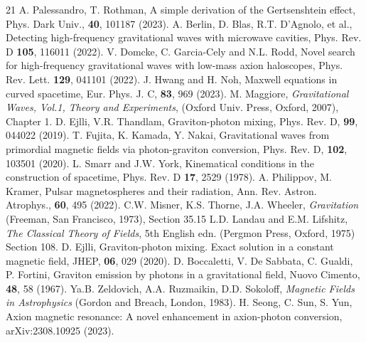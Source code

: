 \documentclass[twocolumn,amsmath,amssymb]{revtex4}
\begin{document}
\begin{thebibliography}{21}
         A. Palessandro, T. Rothman, A simple derivation of the Gertsenshtein effect, Phys. Dark Univ., {\bf 40}, 101187 (2023).
         A. Berlin, D. Blas, R.T. D'Agnolo, et al., Detecting high-frequency gravitational waves with microwave cavities, Phys. Rev. D {\bf 105}, 116011 (2022).
         V. Domcke, C. Garcia-Cely and N.L. Rodd, Novel search for high-frequency gravitational waves with low-mass axion haloscopes, Phys. Rev. Lett. {\bf 129}, 041101 (2022).
         J. Hwang and H. Noh, Maxwell equations in curved spacetime, Eur. Phys. J. C, {\bf 83}, 969 (2023).
         M. Maggiore, {\it Gravitational Waves, Vol.1, Theory and Experiments}, (Oxford Univ. Press, Oxford, 2007), Chapter 1.
         D. Ejlli, V.R. Thandlam, Graviton-photon mixing, Phys. Rev. D, {\bf 99}, 044022 (2019).
         T. Fujita, K. Kamada, Y. Nakai, Gravitational waves from primordial magnetic fields via photon-graviton conversion, Phys. Rev. D, {\bf 102}, 103501 (2020).
         L. Smarr and J.W. York, Kinematical conditions in the construction of spacetime, Phys. Rev. D {\bf 17}, 2529 (1978).
         A. Philippov, M. Kramer, Pulsar magnetospheres and their radiation, Ann. Rev. Astron. Atrophys., {\bf 60}, 495 (2022).
         C.W. Misner, K.S. Thorne, J.A. Wheeler, {\it Gravitation} (Freeman, San Francisco, 1973), Section 35.15
         L.D. Landau and E.M. Lifshitz, {\it The Classical Theory of Fields}, 5th English edn. (Pergmon Press, Oxford, 1975) Section 108.
         D. Ejlli, Graviton-photon mixing. Exact solution in a constant magnetic field, JHEP, {\bf 06}, 029 (2020).
         D. Boccaletti, V. De Sabbata, C. Gualdi, P. Fortini, Graviton emission by photons in a gravitational field, Nuovo Cimento, {\bf 48}, 58 (1967).
         Ya.B. Zeldovich, A.A. Ruzmaikin, D.D. Sokoloff, {\it Magnetic Fields in Astrophysics} (Gordon and Breach, London, 1983).
         H. Seong, C. Sun, S. Yun, Axion magnetic resonance: A novel enhancement in axion-photon conversion, arXiv:2308.10925 (2023).
\end{thebibliography}


\end{document}
